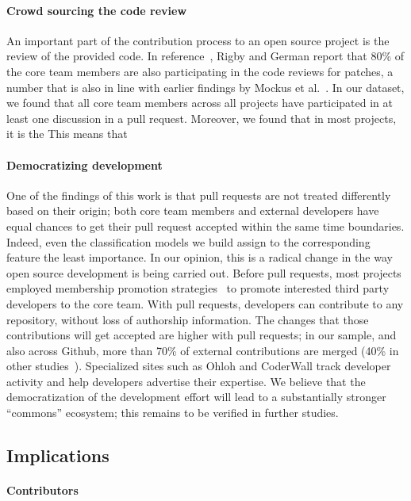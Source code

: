 \documentclass{sig-alternate}
\begin{document}
\paragraph{Crowd sourcing the code review}
An important part of the contribution process to an open source project is the
review of the provided code. In reference~\cite{Rigby06}, Rigby and German
report that 80\% of the core team members are also participating in the code
reviews for patches, a number that is also in line with earlier findings by
Mockus et al.~\cite{MOCKU02}. In our dataset, we found that all core
team members across all projects have participated in at least
one discussion in a pull request. Moreover, we found that in most projects,
it is the 
This means that 

\paragraph{Democratizing development} One of the findings of this work is that
pull requests are not treated differently based on their origin; both core team
members and external developers have equal chances to get their pull request
accepted within the same time boundaries. Indeed, even the classification
models we build assign to the corresponding feature the least importance.
In our opinion, this is a radical
change in the way open source development is being carried out. Before pull
requests, most projects employed membership promotion strategies~\cite{Jense07}
to promote interested third party developers to the core team. With pull
requests, developers can contribute to any repository, without loss of authorship
information. The changes that those contributions will get accepted are higher
with pull requests; in our sample, and also across Github, more than 70\% of external
contributions are merged (40\% in other studies~\cite{Rigby06, Weiss08}).
Specialized sites such as Ohloh and CoderWall track developer activity and help
developers advertise their expertise. We believe that the democratization of the
development effort will lead to a substantially stronger ``commons'' ecosystem;
this remains to be verified in further studies.

\subsection{Implications}

\paragraph{Contributors} 
\end{document}
